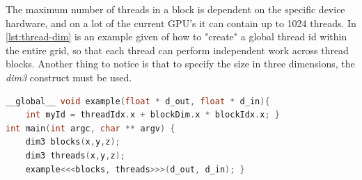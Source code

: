 The maximum number of threads in a block is dependent on the specific device hardware, and on a lot of the current GPU's it can contain up to 1024 threads\cite{cuda:programmingguide}.
In \autoref{lst:thread-dim} is an example given of how to "create" a global thread id within the entire grid, so that each thread can perform independent work across thread blocks.
Another thing to notice is that to specify the size in three dimensions, the \textit{dim3} construct must be used.
\begin{lstlisting}[language=C,caption={Example of thread id usage in a grid of multiple thread blocks},label=lst:thread-dim]
__global__ void example(float * d_out, float * d_in){
	int myId = threadIdx.x + blockDim.x * blockIdx.x; }
int main(int argc, char ** argv) {
	dim3 blocks(x,y,z);
	dim3 threads(x,y,z);
	example<<<blocks, threads>>>(d_out, d_in); }
\end{lstlisting}



